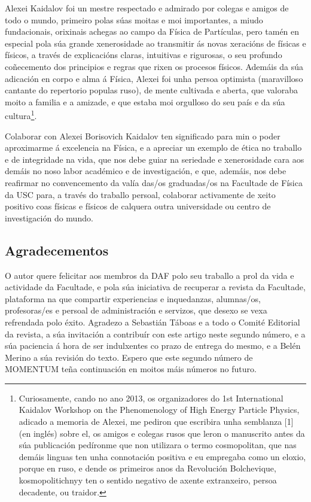 \begin{refsection}
\begin{multicols}{2}
Alexei Kaidalov foi un mestre respectado e admirado por colegas e amigos de todo o mundo, primeiro
polas súas moitas e moi importantes, a miudo fundacionais, orixinais achegas ao campo da Física de Partículas, pero tamén en especial pola súa grande xenerosidade ao transmitir ás novas xeracións de físicas e físicos, a través de explicacións claras, intuitivas e rigurosas, o seu profundo coñecemento dos principios e regras que rixen os procesos físicos. Ademáis da súa adicación en corpo e alma á Física, Alexei foi unha persoa optimista (maravilloso cantante do repertorio populas ruso), de mente cultivada e aberta, que valoraba moito a familia e a amizade, e que estaba moi orgulloso do seu país e da súa cultura\footnote[1]{Curiosamente, cando no ano 2013, os organizadores do 1st International Kaidalov Workshop on the Phenomenology of High Energy Particle Physics, adicado a memoria de Alexei, me pediron que escribira unha semblanza [1] (en inglés) sobre el, os amigos e colegas rusos que leron o manuscrito antes da súa publicación pedíronme que non utilizara o termo cosmopolitan, que nas demáis linguas ten unha connotación positiva e eu empregaba como un eloxio, porque en ruso, e dende os primeiros anos da Revolución Bolchevique, kosmopolitichnyy ten o sentido negativo de axente extranxeiro, persoa decadente, ou traidor.}.

Colaborar con Alexei Borisovich Kaidalov ten significado para min o poder aproximarme á excelencia na Física, e a apreciar un exemplo de ética no traballo e de integridade na vida, que nos debe guiar na seriedade e xenerosidade cara aos demáis no noso labor académico e de investigación, e que, ademáis, nos debe reafirmar no convencemento da valía das/os graduadas/os na Facultade de Física da USC para, a través do traballo persoal, colaborar activamente de xeito positivo coas físicas e físicos de calquera outra universidade ou centro de investigación do mundo.

\subsection*{Agradecementos}

O autor quere felicitar aos membros da DAF polo seu traballo a prol da vida e actividade da Facultade, e pola súa iniciativa de recuperar a revista da Facultade, plataforma na que compartir experiencias e inquedanzas, alumnas/os, profesoras/es e persoal de administración e servizos, que desexo se vexa refrendada polo éxito. Agradezo a Sebastián Táboas e a todo o Comité Editorial da revista, a súa invitación a contribuír con este artigo neste segundo número, e a súa paciencia á hora de ser indulxentes co prazo de entrega do mesmo, e a Belén Merino a súa revisión do texto. Espero que este segundo número de MOMENTUM teña continuación en moitos máis números no futuro. 

\nocite{Merino_2015}

\printbibliography

\end{multicols}
\end{refsection}